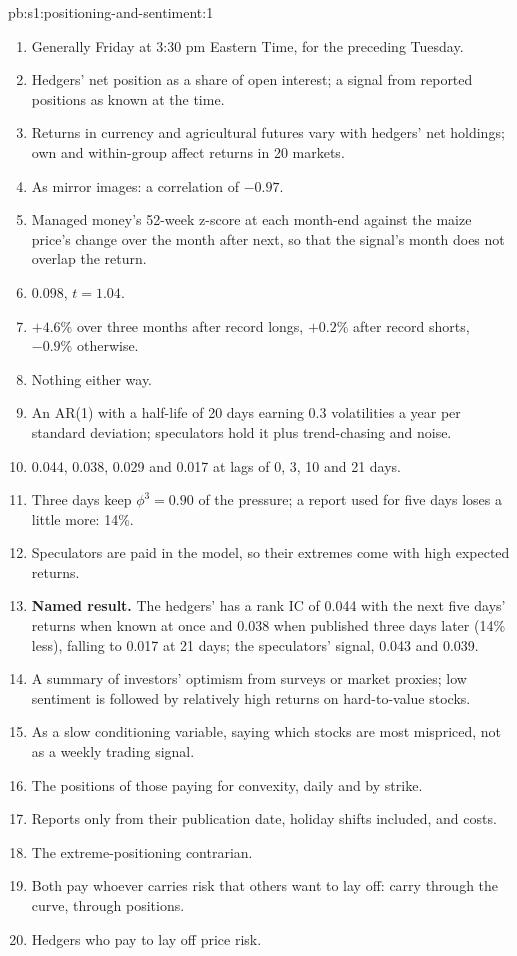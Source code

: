 \begin{solution}{pb:s1:positioning-and-sentiment:1}
\begin{enumerate}
\item Generally Friday at 3:30 pm Eastern Time, for the preceding Tuesday.
\item Hedgers' net position as a share of open interest; a signal from reported positions as known at the time.
\item Returns in currency and agricultural futures vary with hedgers' net holdings; own and within-group  affect returns in 20 markets.
\item As mirror images: a correlation of $-0.97$.
\item Managed money's 52-week z-score at each month-end against the maize price's change over the month after next, so that the signal's month does not
overlap the return.
\item 0.098, $t = 1.04$.
\item $+4.6\%$ over three months after record longs, $+0.2\%$ after record shorts, $-0.9\%$ otherwise.
\item Nothing either way.
\item An AR(1) with a half-life of 20 days earning 0.3 volatilities a year per standard deviation; speculators hold it plus trend-chasing and noise.
\item 0.044, 0.038, 0.029 and 0.017 at lags of 0, 3, 10 and 21 days.
\item Three days keep $\phi^3 = 0.90$ of the pressure; a report used for five days loses a little more: 14\%.
\item Speculators are paid in the model, so their extremes come with high expected returns.
\item \textbf{Named result.} The hedgers'  has a rank IC of 0.044 with the next five days' returns when known at once and 0.038 when
published three days later (14\% less), falling to 0.017 at 21 days; the speculators' signal, 0.043 and 0.039.
\item A summary of investors' optimism from surveys or market proxies; low sentiment is followed by relatively high returns on hard-to-value stocks.
\item As a slow conditioning variable, saying which stocks are most mispriced, not as a weekly trading signal.
\item The positions of those paying for convexity, daily and by strike.
\item Reports only from their publication date, holiday shifts included, and costs.
\item The extreme-positioning contrarian.
\item Both pay whoever carries risk that others want to lay off: carry through the curve,  through positions.
\item Hedgers who pay to lay off price risk.
\end{enumerate}
\end{solution}

